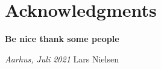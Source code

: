 \chapter*{Acknowledgments}

\textbf{Be nice thank some people}

\bigskip
\bigskip
\bigskip
	 
\noindent\textit{Aarhus, Juli 2021}
\hfill Lars Nielsen
